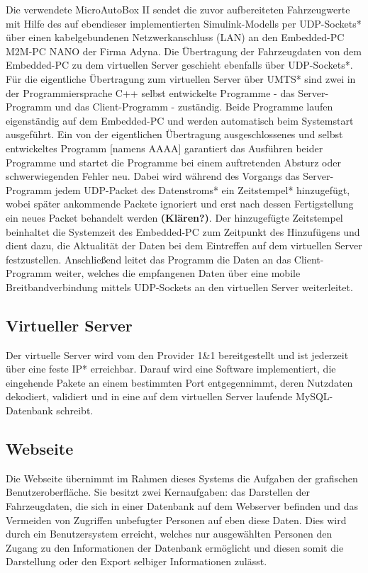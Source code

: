 \documentclass[fontsize = 12pt, paper = a4]{scrreprt}
\begin{document}
Die verwendete MicroAutoBox II sendet die zuvor aufbereiteten Fahrzeugwerte mit Hilfe des auf ebendieser implementierten Simulink-Modells per UDP-Sockets* über einen kabelgebundenen Netzwerkanschluss (LAN) an den Embedded-PC M2M-PC NANO der Firma Adyna. Die Übertragung der Fahrzeugdaten von dem Embedded-PC zu dem virtuellen Server geschieht ebenfalls über UDP-Sockets*. Für die eigentliche Übertragung zum virtuellen Server über UMTS* sind zwei in der Programmiersprache C++ selbst entwickelte Programme - das Server-Programm und das Client-Programm - zuständig. Beide Programme laufen eigenständig auf dem Embedded-PC und werden automatisch beim Systemstart ausgeführt. Ein von der eigentlichen Übertragung ausgeschlossenes und selbst entwickeltes Programm [namens AAAA] garantiert das Ausführen beider Programme und startet die Programme bei einem auftretenden Absturz oder schwerwiegenden Fehler neu. Dabei wird während des Vorgangs das Server-Programm jedem UDP-Packet des Datenstroms* ein Zeitstempel* hinzugefügt, wobei später ankommende Packete ignoriert und erst nach dessen Fertigstellung ein neues Packet behandelt werden \textbf{(Klären?)}. Der hinzugefügte Zeitstempel beinhaltet die Systemzeit des Embedded-PC zum Zeitpunkt des Hinzufügens und dient dazu, die Aktualität der Daten bei dem Eintreffen auf dem virtuellen Server festzustellen. Anschließend leitet das Programm die Daten an das Client-Programm weiter, welches die empfangenen Daten über eine mobile Breitbandverbindung mittels UDP-Sockets an den virtuellen Server weiterleitet. 		


\subsection{Virtueller Server}

Der virtuelle Server wird vom den Provider 1\&1 bereitgestellt und ist jederzeit über eine feste IP* erreichbar. Darauf wird eine Software implementiert, die eingehende Pakete an einem bestimmten Port entgegennimmt, deren Nutzdaten dekodiert, validiert und in eine auf dem virtuellen Server laufende MySQL-Datenbank schreibt. 

\subsection{Webseite}

Die Webseite übernimmt im Rahmen dieses Systems die Aufgaben der grafischen Benutzeroberfläche. Sie besitzt zwei Kernaufgaben: das Darstellen der Fahrzeugdaten, die sich in einer Datenbank auf dem Webserver befinden und das Vermeiden von Zugriffen unbefugter Personen auf eben diese Daten. Dies wird durch ein Benutzersystem erreicht, welches nur ausgewählten Personen den Zugang zu den Informationen der Datenbank ermöglicht und diesen somit die Darstellung oder den Export selbiger Informationen zulässt.
\end{document}
